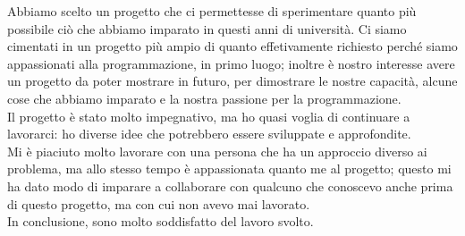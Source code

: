 \documentclass[11pt]{article}
\begin{document}
Abbiamo scelto un progetto che ci permettesse di sperimentare quanto più
possibile ciò che abbiamo imparato in questi anni di università. Ci siamo 
cimentati in un progetto più ampio di quanto effetivamente
richiesto perché siamo appassionati alla programmazione, in primo luogo; inoltre
è nostro interesse avere un progetto da poter mostrare in futuro, per
dimostrare le nostre capacità, alcune cose che abbiamo imparato e la nostra
passione per la programmazione. \\
Il progetto è stato molto impegnativo, ma ho quasi voglia di continuare a
lavorarci: ho diverse idee che potrebbero essere sviluppate e approfondite.\\
Mi è piaciuto molto lavorare con una persona che ha un approccio diverso ai
problema, ma allo stesso tempo è appassionata quanto me al progetto; questo
mi ha dato modo di imparare a collaborare con qualcuno che conoscevo anche
prima di questo progetto, ma con cui non avevo mai lavorato. \\
In conclusione, sono molto soddisfatto del lavoro svolto.
\end{document}
